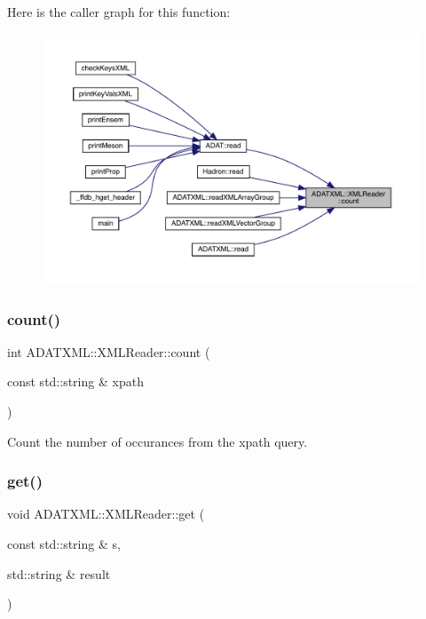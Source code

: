 Here is the caller graph for this function\+:\nopagebreak
\begin{figure}[H]
\begin{center}
\leavevmode
\includegraphics[width=350pt]{db/d3f/classADATXML_1_1XMLReader_a59584913f1338d956de60adef16a0718_icgraph}
\end{center}
\end{figure}
\mbox{\label{classADATXML_1_1XMLReader_a59584913f1338d956de60adef16a0718}} 
\subsubsection{\texorpdfstring{count()}{count()}\hspace{0.1cm}{\footnotesize\ttfamily [2/2]}}
{\footnotesize\ttfamily int A\+D\+A\+T\+X\+M\+L\+::\+X\+M\+L\+Reader\+::count (\begin{DoxyParamCaption}\item[{const std\+::string \&}]{xpath }\end{DoxyParamCaption})}



Count the number of occurances from the xpath query. 

\mbox{\label{classADATXML_1_1XMLReader_a5ed2bbc9de7ba505e6ce37c1a5f90fee}} 
\subsubsection{\texorpdfstring{get()}{get()}\hspace{0.1cm}{\footnotesize\ttfamily [1/20]}}
{\footnotesize\ttfamily void A\+D\+A\+T\+X\+M\+L\+::\+X\+M\+L\+Reader\+::get (\begin{DoxyParamCaption}\item[{const std\+::string \&}]{s,  }\item[{std\+::string \&}]{result }\end{DoxyParamCaption})\hspace{0.3cm}{\ttfamily [inline]}}

